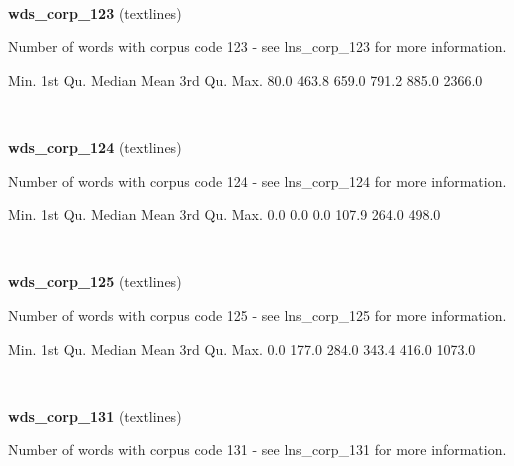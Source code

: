 \documentclass[]{article}
\newenvironment{Shaded}{\begin{snugshade}}{\end{snugshade}}
\newcommand{\FloatTok}[1]{\textcolor[rgb]{0.00,0.00,0.81}{{#1}}}
\newcommand{\NormalTok}[1]{{#1}}
\begin{document}
~

\vspace{1em}

\textbf{wds\_corp\_123} (textlines)

Number of words with corpus code 123 - see lns\_corp\_123 for more
information.

\begin{Shaded}
\begin{Highlighting}[]
   \NormalTok{Min. 1st Qu.  Median    Mean 3rd Qu.    Max. }
   \FloatTok{80.0}   \FloatTok{463.8}   \FloatTok{659.0}   \FloatTok{791.2}   \FloatTok{885.0}  \FloatTok{2366.0} 
\end{Highlighting}
\end{Shaded}

~

\vspace{1em}

\textbf{wds\_corp\_124} (textlines)

Number of words with corpus code 124 - see lns\_corp\_124 for more
information.

\begin{Shaded}
\begin{Highlighting}[]
   \NormalTok{Min. 1st Qu.  Median    Mean 3rd Qu.    Max. }
    \FloatTok{0.0}     \FloatTok{0.0}     \FloatTok{0.0}   \FloatTok{107.9}   \FloatTok{264.0}   \FloatTok{498.0} 
\end{Highlighting}
\end{Shaded}

~

\vspace{1em}

\textbf{wds\_corp\_125} (textlines)

Number of words with corpus code 125 - see lns\_corp\_125 for more
information.

\begin{Shaded}
\begin{Highlighting}[]
   \NormalTok{Min. 1st Qu.  Median    Mean 3rd Qu.    Max. }
    \FloatTok{0.0}   \FloatTok{177.0}   \FloatTok{284.0}   \FloatTok{343.4}   \FloatTok{416.0}  \FloatTok{1073.0} 
\end{Highlighting}
\end{Shaded}

~

\vspace{1em}

\textbf{wds\_corp\_131} (textlines)

Number of words with corpus code 131 - see lns\_corp\_131 for more
information.
\end{document}
